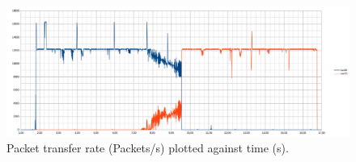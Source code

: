 \documentclass[a4paper, 11pt]{report}
\begin{document}
\begin{landscape}


\end{landscape}

\restoregeometry

\begin{figure}[H]
    \includegraphics[width=\linewidth]{exp6_item5_hist.png}
    \caption{Packet transfer rate (Packets/s) plotted against time (s).}
    \label{fig:exp6_item5}
\end{figure}
\end{document}
